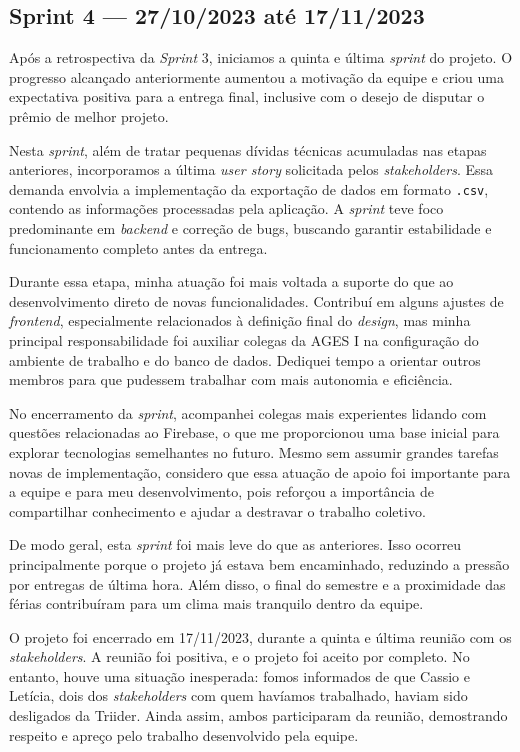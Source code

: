 \clearpage
\subsection{Sprint 4 --- 27/10/2023 até 17/11/2023}

Após a retrospectiva da \textit{Sprint} 3, iniciamos a quinta e última \textit{sprint} do projeto. O progresso alcançado anteriormente aumentou a motivação da equipe e criou uma expectativa positiva para a entrega final, inclusive com o desejo de disputar o prêmio de melhor projeto.

Nesta \textit{sprint}, além de tratar pequenas dívidas técnicas acumuladas nas etapas anteriores, incorporamos a última \textit{user story} solicitada pelos \textit{stakeholders}. Essa demanda envolvia a implementação da exportação de dados em formato \texttt{.csv}, contendo as informações processadas pela aplicação. A \textit{sprint} teve foco predominante em \textit{backend} e correção de bugs, buscando garantir estabilidade e funcionamento completo antes da entrega.

Durante essa etapa, minha atuação foi mais voltada a suporte do que ao desenvolvimento direto de novas funcionalidades. Contribuí em alguns ajustes de \textit{frontend}, especialmente relacionados à definição final do \textit{design}, mas minha principal responsabilidade foi auxiliar colegas da \ac{AGES} I na configuração do ambiente de trabalho e do banco de dados. Dediquei tempo a orientar outros membros para que pudessem trabalhar com mais autonomia e eficiência.

No encerramento da \textit{sprint}, acompanhei colegas mais experientes lidando com questões relacionadas ao Firebase, o que me proporcionou uma base inicial para explorar tecnologias semelhantes no futuro. Mesmo sem assumir grandes tarefas novas de implementação, considero que essa atuação de apoio foi importante para a equipe e para meu desenvolvimento, pois reforçou a importância de compartilhar conhecimento e ajudar a destravar o trabalho coletivo.

De modo geral, esta \textit{sprint} foi mais leve do que as anteriores. Isso ocorreu principalmente porque o projeto já estava bem encaminhado, reduzindo a pressão por entregas de última hora. Além disso, o final do semestre e a proximidade das férias contribuíram para um clima mais tranquilo dentro da equipe.

O projeto foi encerrado em 17/11/2023, durante a quinta e última reunião com os \textit{stakeholders}. A reunião foi positiva, e o projeto foi aceito por completo. No entanto, houve uma situação inesperada: fomos informados de que Cassio e Letícia, dois dos \textit{stakeholders} com quem havíamos trabalhado, haviam sido desligados da Triider. Ainda assim, ambos participaram da reunião, demostrando respeito e apreço pelo trabalho desenvolvido pela equipe.


